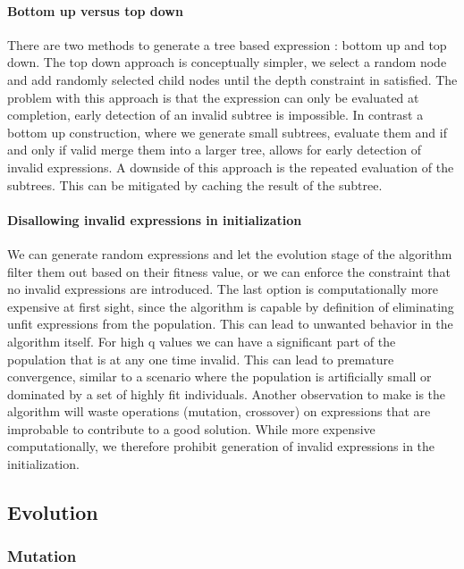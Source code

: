 \paragraph{Bottom up versus top down}
There are two methods to generate a tree based expression : bottom up and top down. The top down approach is conceptually simpler, we select a random node and add randomly selected child nodes until the depth constraint in satisfied. The problem with this approach is that the expression can only be evaluated at completion, early detection of an invalid subtree is impossible. 
In contrast a bottom up construction, where we generate small subtrees, evaluate them and if and only if valid merge them into a larger tree, allows for early detection of invalid expressions. A downside of this approach is the repeated evaluation of the subtrees. This can be mitigated by caching the result of the subtree.

\paragraph{Disallowing invalid expressions in initialization}
We can generate random expressions and let the evolution stage of the algorithm filter them out based on their fitness value, or we can enforce the constraint that no invalid expressions are introduced. The last option is computationally more expensive at first sight, since the algorithm is capable by definition of eliminating unfit expressions from the population. 
This can lead to unwanted behavior in the algorithm itself. For high q values we can have a significant part of the population that is at any one time invalid. This can lead to premature convergence, similar to a scenario where the population is artificially small or dominated by a set of highly fit individuals. Another observation to make is the algorithm will waste operations (mutation, crossover) on expressions that are improbable to contribute to a good solution. 
While more expensive computationally, we therefore prohibit generation of invalid expressions in the initialization. 


\subsection{Evolution}

\subsubsection{Mutation}

